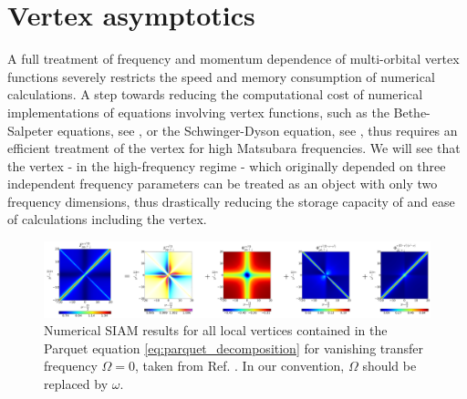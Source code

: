 \documentclass[../../main.tex]{subfiles}
\begin{document}
\section{Vertex asymptotics}

A full treatment of frequency and momentum dependence of multi-orbital vertex functions severely restricts the speed and memory consumption of numerical calculations. A step towards reducing the computational cost of numerical implementations of equations involving vertex functions, such as the Bethe-Salpeter equations, see , or the Schwinger-Dyson equation, see , thus requires an efficient treatment of the vertex for high Matsubara frequencies. We will see that the vertex - in the high-frequency regime - which originally depended on three independent frequency parameters can be treated as an object with only two frequency dimensions, thus drastically reducing the storage capacity of and ease of calculations including the vertex.
\begin{figure}[ht!]
	\centering
	\includegraphics[width=\linewidth]{../../Graphics/vertex_asymptotics_paper.png}
	\caption{Numerical SIAM results for all local vertices contained in the Parquet equation \eqref{eq:parquet_decomposition} for vanishing transfer frequency $\Omega=0$, taken from Ref. \cite{high-freq asympt}. In our convention, $\Omega$ should be replaced by $\omega$.}
	\label{fig:full_vertex_siam_results_paper}
\end{figure}
\end{document}
